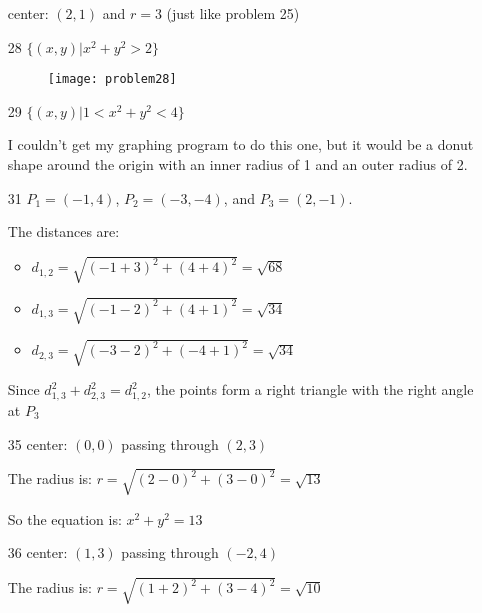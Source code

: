 \documentclass[fleqn,addpoints]{exam}
\begin{document}
\begin{itemize}
center: $(2, 1)$ and $r=3$ (just like problem 25)

\item[28]
$\{(x, y) | x^2 + y^2 > 2\}$

\begin{figure}[H]
  \texttt{[image: problem28]}
\end{figure}

\item[29]
$\{(x, y) | 1 < x^2 + y^2 < 4\}$

I couldn't get my graphing program to do this one, but it would be a donut shape around the origin with an inner radius
of 1 and an outer radius of 2.

\item[31]
$P_1 = (-1, 4)$, $P_2 = (-3, -4)$, and $P_3 = (2, -1)$.

The distances are:
\begin{itemize}
  \item $d_{1,2} = \sqrt{(-1+3)^2 + (4+4)^2} = \sqrt{68}$
  \item $d_{1,3} = \sqrt{(-1-2)^2 + (4+1)^2} = \sqrt{34}$
  \item $d_{2,3} = \sqrt{(-3-2)^2 + (-4+1)^2} = \sqrt{34}$
\end{itemize}

Since $d_{1,3}^2 + d_{2,3}^2 = d_{1,2}^2$, the points form a right triangle with the right angle at $P_3$



\item[35]
center: $(0, 0)$ passing through $(2, 3)$

The radius is: $r = \sqrt{(2 - 0)^2 + (3 - 0)^2} = \sqrt{13}$

So the equation is: $x^2+y^2 = 13$

\item[36]
center: $(1, 3)$ passing through $(-2, 4)$

The radius is: $r = \sqrt{(1+2)^2 + (3 - 4)^2} = \sqrt{10}$


\end{itemize}
\end{document}
